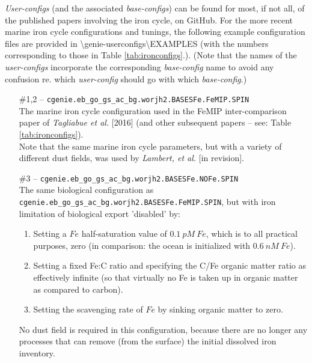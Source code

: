 \textit{User-configs} (and the associated \textit{base-configs}) can be found for most, if not all, of the published papers involving the iron cycle, on GitHub. For the more recent marine iron cycle configurations and tunings, the following example configuration files are provided in \textsf{\footnotesize \textbackslash genie-userconfigs\textbackslash  EXAMPLES} (with the numbers corresponding to those in Table \ref{tab:ironconfigs}.). (Note that the names of the \textit{user-configs} incorporate the corresponding \textit{base-config} name to avoid any confusion re. which \textit{user-config} should go with which \textit{base-config}.)
\vspace{1mm}
\begin{itemize}[noitemsep]
\vspace{1mm}
\item [\#1,2] -- \texttt{cgenie.eb\_go\_gs\_ac\_bg.worjh2.BASESFe.FeMIP.SPIN}
\vspace{1mm}
\\The marine iron cycle configuration used in the FeMIP inter-comparison paper of \textit{Tagliabue et al.} [2016] (and other subsequent papers -- see: Table \ref{tab:ironconfigs}).
\\Note that the same marine iron cycle parameters, but with a variety of different dust fields, was used by \textit{Lambert, et al.} [in revision].
\vspace{1mm}
\item [\#3] -- \texttt{cgenie.eb\_go\_gs\_ac\_bg.worjh2.BASESFe.NOFe.SPIN}
\vspace{1mm}
\\The same biological configuration as \texttt{\small cgenie.eb\_go\_gs\_ac\_bg.worjh2.BASESFe.FeMIP.SPIN}, but with iron limitation of biological export 'disabled' by:
\begin{enumerate}[noitemsep]
\item Setting a \(Fe\) half-saturation value of \(0.1\:pM\:Fe\), which is to all practical purposes, zero (in comparison: the ocean is initialized with \(0.6\ nM\:Fe\)).
\item Setting a fixed Fe:C ratio and specifying the C/Fe organic matter ratio as effectively infinite (so that virtually no Fe is taken up in organic matter as compared to carbon).
\item Setting the scavenging rate of \(Fe\) by sinking organic matter to zero.
\end{enumerate}
No dust field is  required in this configuration, because there are no longer any processes that can remove (from the surface) the initial dissolved iron inventory.

\end{itemize}

